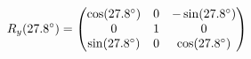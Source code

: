 \documentclass[preview]{standalone}
\begin{document}
\begin{align*}
\special{dvisvgm:raw <g id='unique000'>}R_y(27.8^\circ) = \begin{pmatrix} \cos(27.8^\circ) & 0 & -\sin(27.8^\circ) \\ 0 & 1 & 0 \\ \sin(27.8^\circ) & 0 & \cos(27.8^\circ) \end{pmatrix}\special{dvisvgm:raw </g>}
\end{align*}
\end{document}

